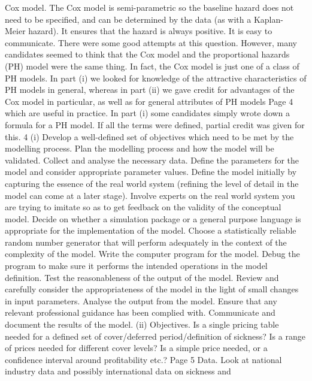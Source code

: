 \documentclass[a4paper,12pt]{article}
\begin{document}
\begin{enumerate}
Cox model.
The Cox model is semi-parametric so the baseline hazard does not
need to be specified, and can be determined by the data (as with a Kaplan-
Meier hazard).
It ensures that the hazard is always positive.
It is easy to communicate.
There were some good attempts at this question. However, many candidates seemed to think
that the Cox model and the proportional hazards (PH) model were the same thing. In fact,
the Cox model is just one of a class of PH models. In part (i) we looked for knowledge of the
attractive characteristics of PH models in general, whereas in part (ii) we gave credit for
advantages of the Cox model in particular, as well as for general attributes of PH models
Page 4 %
which are useful in practice. In part (i) some candidates simply wrote down a formula for a
PH model. If all the terms were defined, partial credit was given for this.
4
(i)
Develop a well-defined set of objectives which need to be met by the
modelling process.
Plan the modelling process and how the model will be validated.
Collect and analyse the necessary data.
Define the parameters for the model and consider appropriate parameter
values.
Define the model initially by capturing the essence of the real world
system (refining the level of detail in the model can come at a later stage).
Involve experts on the real world system you are trying to imitate so as to get
feedback on the validity of the conceptual model.
Decide on whether a simulation package or a general purpose language is
appropriate for the implementation of the model.
Choose a statistically reliable random number generator that will perform
adequately in the context of the complexity of the model.
Write the computer program for the model.
Debug the program to make sure it performs the intended operations in the
model definition.
Test the reasonableness of the output of the model.
Review and carefully consider the appropriateness of the model in the light of
small changes in input parameters.
Analyse the output from the model.
Ensure that any relevant professional guidance has been complied with.
Communicate and document the results of the model.
(ii)
Objectives.
Is a single pricing table needed for a defined set of cover/deferred
period/definition of sickness?
Is a range of prices needed for different cover levels?
Is a simple price needed, or a confidence interval around profitability etc.?
Page 5 %
Data.
Look at national industry data and possibly international data on sickness and

\end{enumerate}
\end{document}
